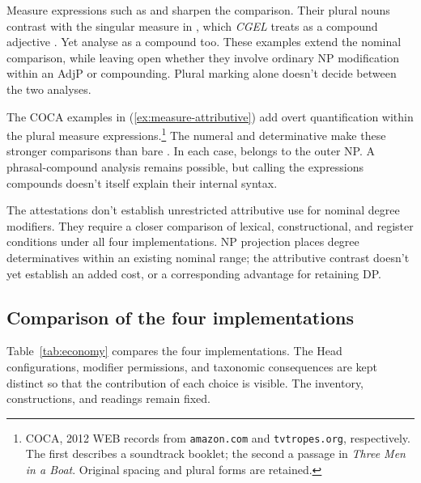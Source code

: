 \documentclass[12pt]{article}
\begin{document}
Measure expressions such as  and  sharpen the comparison. Their plural nouns contrast with the singular measure in , which \textit{CGEL} treats as a compound adjective \citep[552, 1660]{huddleston2002}. Yet \textcite[68]{alegregordon1996} analyse  as a compound too. These examples extend the nominal comparison, while leaving open whether they involve ordinary NP modification within an AdjP or compounding. Plural marking alone doesn't decide between the two analyses.

The COCA examples in (\ref{ex:measure-attributive}) add overt quantification within the plural measure expressions.\footnote{COCA, 2012 WEB records from \nolinkurl{amazon.com} and \nolinkurl{tvtropes.org}, respectively. The first describes a soundtrack booklet; the second a passage in \textit{Three Men in a Boat}. Original spacing and plural forms are retained.} The numeral  and determinative  make these stronger comparisons than bare . In each case,  belongs to the outer NP. A phrasal-compound analysis remains possible, but calling the expressions compounds doesn't itself explain their internal syntax.

\ea\label{ex:measure-attributive}
\ea {}
\ex {}
\z\z

The attestations don't establish unrestricted attributive use for nominal degree modifiers. They require a closer comparison of lexical, constructional, and register conditions under all four implementations. NP projection places degree determinatives within an existing nominal range; the attributive contrast doesn't yet establish an added cost, or a corresponding advantage for retaining DP.

\subsection{Comparison of the four implementations}\label{sec:costs}

Table~\ref{tab:economy} compares the four implementations. The Head configurations, modifier permissions, and taxonomic consequences are kept distinct so that the contribution of each choice is visible. The inventory, constructions, and readings remain fixed.
\end{document}
